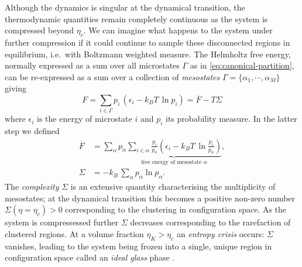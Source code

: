 \documentclass[11pt,twoside]{report}
\begin{document}
Although the dynamics is singular at the dynamical transition, the thermodynamic quantities remain completely continuous as the system is compressed beyond $\eta_c$.
We can imagine what happens to the system under further compression if it could continue to sample these disconnected regions in equilibrium, i.e.\ with Boltzmann weighted measure.
The Helmholtz free energy, normally expressed as a sum over all microstates $\Gamma$ as in \eqref{eq:canonical-partition}, can be re-expressed as a sum over a collection of \emph{mesostates} $\Gamma = \{\alpha_1, \cdots, \alpha_M\}$ giving
\begin{equation}
    F = \sum_{i \in \Gamma} p_i \, (\epsilon_i - k_B T \, \ln{p_i})
    = \overline{F} - T \Sigma
\end{equation}
where $\epsilon_i$ is the energy of microstate $i$ and $p_i$ its probability measure.
In the latter step we defined%
\begin{subequations}
  \begin{align}
    \overline{F}
    &=
    \sum_\alpha p_\alpha
    \underbrace{
      \sum_{i \in \alpha} \frac{p_i}{p_\alpha}
      \left(
      \epsilon_i - k_B T \, \ln{\frac{p_i}{p_\alpha}}
      \right)
    }_\textrm{free energy of mesostate $\alpha$},
    \\
    \Sigma &= - k_B \, \sum_\alpha p_\alpha \ln{p_\alpha}.
  \end{align}
\end{subequations}
The \emph{complexity} $\Sigma$ is an extensive quantity characterising the multiplicity of mesostates; at the dynamical transition this becomes a positive non-zero number $\Sigma(\eta = \eta_c) > 0$ corresponding to the clustering in configuration space.
As the system is compressessed further $\Sigma$ decreases \cite{KirkpatrickPRB1987,KirkpatrickPRA1989,ParisiRMP2010} corresponding to the rarefaction of clustered regions.
At a volume fraction $\eta_K > \eta_c$ an \emph{entropy crisis} occurs: $\Sigma$ vanishes, leading to the system being frozen into a single, unique region in configuration space called an \emph{ideal glass} phase \cite{KauzmannCR1948,KirkpatrickPRB1987,HallJCP1987,KirkpatrickPRA1989,ParisiRMP2010,BerthierRMP2011}.
\end{document}
